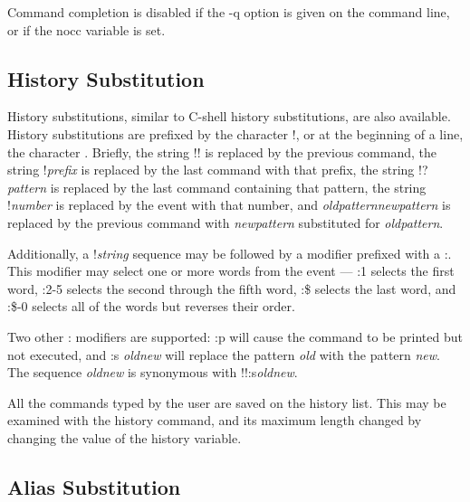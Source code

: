 Command completion is disabled if the {\vt -q} option is given on the
{\WRspice} command line, or if the {\et nocc} variable is set.

\subsection{History Substitution}


History substitutions, similar to C-shell history substitutions, are
also available.  History substitutions are prefixed by the character
{\vt !}, or at the beginning of a line, the character {\vt
{}}.  Briefly, the string {\vt !!} is replaced by the
previous command, the string {\vt !}{\it prefix} is replaced by the
last command with that prefix, the string {\vt !}?{\it pattern} is
replaced by the last command containing that pattern, the string {\vt
!}{\it number} is replaced by the event with that number, and {\vt
{}}{\it oldpattern\/}{\vt {}}{\it newpattern\/} is
replaced by the previous command with {\it newpattern\/} substituted
for {\it oldpattern\/}.

Additionally, a {\vt !}{\it string} sequence may be followed by a
modifier prefixed with a {\vt :}.  This modifier may select one or
more words from the event --- {\vt :1} selects the first word, {\vt
:2-5} selects the second through the fifth word, {\vt :\$} selects the
last word, and {\vt :\$-0} selects all of the words but reverses their
order.

Two other {\vt :} modifiers are supported: {\vt :p} will cause the
command to be printed but not executed, and {\vt :s}{\it
old\/}{\vt {}}{\it new\/} will replace the pattern {\it
old\/} with the pattern {\it new\/}.  The sequence {\vt
{}}{\it old\/}{\vt {}}{\it new\/} is synonymous with
{\vt !!:s}{\it old\/}{\vt {}}{\it new\/}.

All the commands typed by the user are saved on the history list. 
This may be examined with the {\cb history} command, and its maximum
length changed by changing the value of the {\et history} variable.

\subsection{Alias Substitution}

